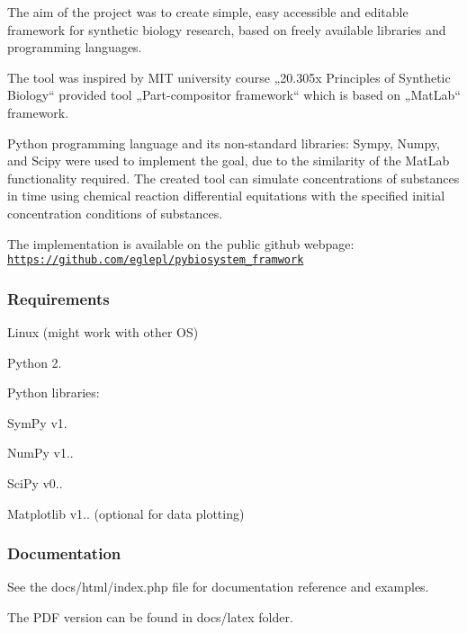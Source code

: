 The aim of the project was to create simple, easy accessible and editable framework for synthetic biology research, based on freely available libraries and programming languages.

The tool was inspired by M\+IT university course „20.305x Principles of Synthetic Biology“ provided tool „\+Part-\/compositor framework“ which is based on „\+Mat\+Lab“ framework.

Python programming language and its non-\/standard libraries\+: Sympy, Numpy, and Scipy were used to implement the goal, due to the similarity of the Mat\+Lab functionality required. The created tool can simulate concentrations of substances in time using chemical reaction differential equitations with the specified initial concentration conditions of substances.

The implementation is available on the public github webpage\+: \href{https://github.com/eglepl/pybiosystem_framwork}{\tt https\+://github.\+com/eglepl/pybiosystem\+\_\+framwork}





\subsubsection*{Requirements }


\begin{DoxyItemize}
\item Linux (might work with other OS)
\item Python 2.
\item Python libraries\+:
\begin{DoxyItemize}
\item Sym\+Py v1.
\item Num\+Py v1..
\item Sci\+Py v0..
\item Matplotlib v1.. (optional for data plotting) 


\end{DoxyItemize}
\end{DoxyItemize}

\subsubsection*{Documentation }

See the docs/html/index.\+php file for documentation reference and examples.

The P\+DF version can be found in docs/latex folder. 



